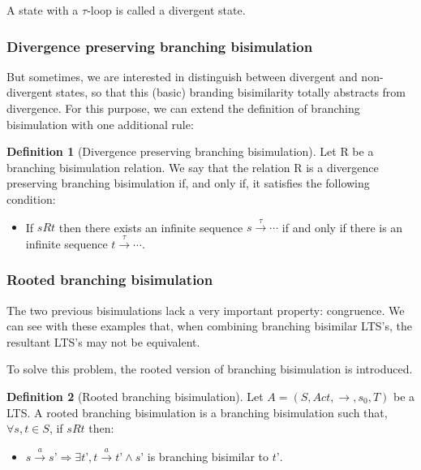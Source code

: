 \documentclass[11pt]{article}
\theoremstyle{definition}
\newtheorem{definition}{Definition}
\theoremstyle{plain}
\theoremstyle{definition}
\begin{document}
A state with a $ \tau $-loop is called a divergent state.

\subsubsection{Divergence preserving branching bisimulation}
But sometimes, we are interested in distinguish between divergent and non-divergent states, so that this (basic) branding bisimilarity totally abstracts from divergence. For this purpose, we can extend the definition of branching bisimulation with one additional rule:
\begin{definition} [Divergence preserving branching bisimulation]
	Let R be a branching bisimulation relation. We say that the relation R is a divergence preserving branching bisimulation if, and only if, it satisfies the following condition:
	\begin{itemize}
		\item If $ s R t $ then there exists an infinite sequence $ s\xrightarrow{\tau}\cdots $ if and only if there is an infinite sequence $ t\xrightarrow{\tau}\cdots$.
	\end{itemize}
\end{definition}

\subsubsection{Rooted branching bisimulation}

The two previous bisimulations lack a very important property: congruence. We can see with these examples that, when combining branching bisimilar LTS’s, the resultant LTS’s may not be equivalent. 

%	
%	

To solve this problem, the rooted version of branching bisimulation is introduced.
\begin{definition} [Rooted branching bisimulation]
	Let $ A = (S, Act, \rightarrow, s_0, T) $ be a LTS. A rooted branching bisimulation is a branching bisimulation such that, $ \forall s,t \in S$, if $ s R t $ then:
	\begin{itemize}
		\item $ s\xrightarrow{a}s’ \Rightarrow \exists t’, t\xrightarrow{a}t’ \wedge s’$ is branching bisimilar to $ t’ $.
	\end{itemize}
\end{definition}
\end{document}
